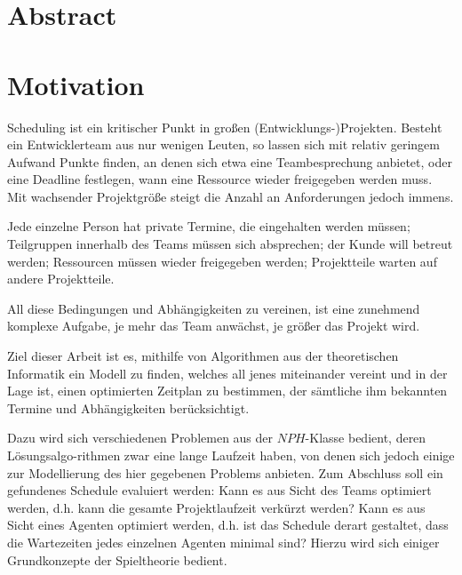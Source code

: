 \documentclass[12pt,twoside]{article}
\theoremstyle{plain}
\theoremstyle{definition}
\theoremstyle{remark}
\begin{document}
\thispagestyle{empty}
\hspace{1cm}
\newpage


\section*{Abstract}
\lipsum[99]
\setcounter{tocdepth}{2} 					%
\tableofcontents
{}
\clearpage

\section{Motivation}
\label{sec:intro}
Scheduling ist ein kritischer Punkt in großen (Entwicklungs-)Projekten.
Besteht ein Entwicklerteam aus nur wenigen Leuten, so lassen sich mit relativ geringem Aufwand Punkte finden, an denen sich etwa eine Teambesprechung anbietet, oder eine Deadline festlegen, wann eine Ressource wieder freigegeben werden muss.
Mit wachsender Projektgröße steigt die Anzahl an Anforderungen jedoch immens.

Jede einzelne Person hat private Termine, die eingehalten werden müssen; Teilgruppen innerhalb des Teams müssen sich absprechen; der Kunde will betreut werden; Ressourcen müssen wieder freigegeben werden; Projektteile warten auf andere Projektteile.

All diese Bedingungen und Abhängigkeiten zu vereinen, ist eine zunehmend komplexe Aufgabe, je mehr das Team anwächst, je größer das Projekt wird.

Ziel dieser Arbeit ist es, mithilfe von Algorithmen aus der theoretischen Informatik ein Modell zu finden, welches all jenes miteinander vereint und in der Lage ist, einen optimierten Zeitplan zu bestimmen, der sämtliche ihm bekannten Termine und Abhängigkeiten berücksichtigt.

Dazu wird sich verschiedenen Problemen aus der $NPH$-Klasse bedient, deren Lösungsalgo-rithmen zwar eine lange Laufzeit haben, von denen sich jedoch einige zur Modellierung des hier gegebenen Problems anbieten.
Zum Abschluss soll ein gefundenes Schedule evaluiert werden:
Kann es aus Sicht des Teams optimiert werden, d.h. kann die gesamte Projektlaufzeit verkürzt werden?
Kann es aus Sicht eines Agenten optimiert werden, d.h. ist das Schedule derart gestaltet, dass die Wartezeiten jedes einzelnen Agenten minimal sind?
Hierzu wird sich einiger Grundkonzepte der Spieltheorie bedient.
\end{document}
